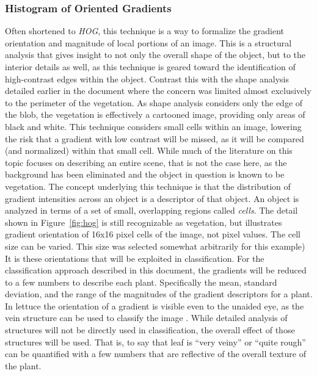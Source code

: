 \documentclass[letterpaper]{report}
\begin{document}
\subsubsection{Histogram of Oriented Gradients}
Often shortened to \textit{HOG}, this technique is a way to formalize the gradient orientation and magnitude of local portions of an image\parencite[p.~155]{Forsyth2012-hy}. This is a structural analysis that gives insight to not only the overall shape of the object, but to the interior details as well, as this technique is geared toward the identification of high-contrast edges within the object. Contrast this with the shape analysis detailed earlier in the document where the concern was limited almost exclusively to the perimeter of the vegetation.  As shape analysis considers only the edge of the blob, the vegetation is effectively a cartooned image, providing only areas of black and white. This technique considers small cells within an image, lowering the risk that a gradient with low contrast will be missed, as it will be compared (and normalized) within that small cell. While much of the literature on this topic focuses on describing an entire scene, that is not the case here, as the background has been eliminated and the object in question is known to be vegetation. The concept underlying this technique is that the distribution of gradient intensities across an object is a descriptor of that object. An object is analyzed in terms of a set of small, overlapping regions called \textit{cells}.
The detail shown in Figure~\ref{fig:hog} is still recognizable as vegetation, but illustrates gradient orientation of 16x16 pixel cells of the image, not pixel values. The cell size can be varied. This size was selected somewhat arbitrarily for this example) It is these orientations that will be exploited in classification.  For the classification approach described in this document, the gradients will be reduced to a few numbers to describe each plant. Specifically the mean, standard deviation, and the range of the magnitudes of the gradient descriptors for a plant. In lettuce the orientation of a gradient is visible even to the unaided eye, as the vein structure can be used to classify the image \parencite{Elhariri2014-eo}. While detailed analysis of structures will not be directly used in classification, the overall effect of those structures will be used. That is, to say that leaf is ``very veiny'' or ``quite rough'' can be quantified with a few numbers that are reflective of the overall texture of the plant.
\end{document}
